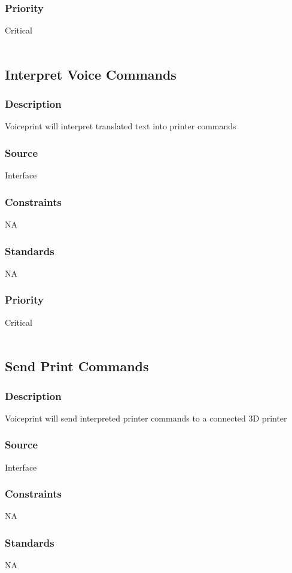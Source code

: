 \subsubsection{Priority}
Critical\\
\\
\subsection{Interpret Voice Commands}
\subsubsection{Description}
Voiceprint will interpret translated text into printer commands
\subsubsection{Source}
Interface
\subsubsection{Constraints}
NA
\subsubsection{Standards}
NA
\subsubsection{Priority}
Critical \\
\\
\subsection{Send Print Commands}
\subsubsection{Description}
Voiceprint will send interpreted printer commands to a connected 3D printer
\subsubsection{Source}
Interface
\subsubsection{Constraints}
NA
\subsubsection{Standards}
NA
